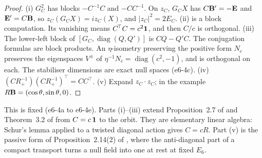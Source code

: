\begin{proof}
(i) $G_C^2$ has blocks $-C^{-1}C$ and $-CC^{-1}$. On $z_C$, $G_CX$ has $C\mathbf B'=-\mathbf E$ and $\mathbf E'=C\mathbf B$, so $z_C(G_CX)=iz_C(X)$, and $|z_C|^2=2E_C$. (ii) is a
block computation. Its vanishing means $C^{\!\top}C=c^2\mathbf 1$, and then $C/c$ is orthogonal. (iii) The lower-left block of $[G_C,\operatorname{diag}(Q,Q')]$ is
$CQ-Q'C$. The conjugation formulas are block products. An $\eta$-isometry preserving the positive form $N_c$ preserves the eigenspaces $V^\pm$ of
$\eta^{-1}N_c=\operatorname{diag}(c^2,-1)$, and is orthogonal on each. The stabiliser dimensions are exact null spaces (e6-4c). (iv)
$(CR_+^{-1})(CR_+^{-1})^{\!\top}=CC^{\!\top}$. (v) Expand $z_C\cdot z_C$; in the example $R\mathbf B=(\cos\theta,\sin\theta,0)$.
\end{proof}

This is fixed (e6-4a to e6-4e). Parts (i)--(iii) extend Proposition~2.7 of \cite{RE} and Theorem~3.2 of \cite{ES17} from $C=c\,\mathbf 1$ to the orbit. They are
elementary linear algebra: Schur's lemma applied to a twisted diagonal action gives $C=cR$. Part (v) is the passive form of Proposition~2.14(2) of
\cite{RE}, where the anti-diagonal part of a compact transport turns a null field into one at rest at fixed $E_6$.

